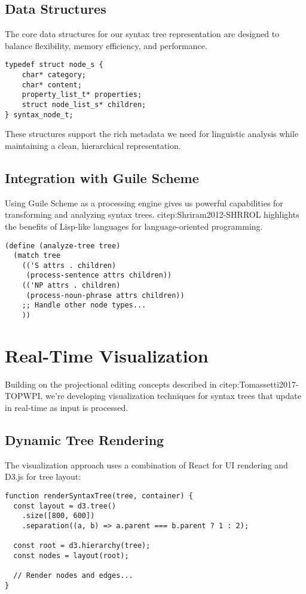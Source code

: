 \documentclass[a4paper,11pt]{article}
\begin{document}
\subsection{Data Structures}
\label{sec:org88788cd}

The core data structures for our syntax tree representation are designed to balance flexibility, memory efficiency, and performance.

\begin{verbatim}
typedef struct node_s {
    char* category;
    char* content;
    property_list_t* properties;
    struct node_list_s* children;
} syntax_node_t;
\end{verbatim}

These structures support the rich metadata we need for linguistic analysis while maintaining a clean, hierarchical representation.
\subsection{Integration with Guile Scheme}
\label{sec:orge7e1da4}

Using Guile Scheme as a processing engine gives us powerful capabilities for transforming and analyzing syntax trees. citep:Shriram2012-SHRROL highlights the benefits of Lisp-like languages for language-oriented programming.

\begin{verbatim}
(define (analyze-tree tree)
  (match tree
    (('S attrs . children)
     (process-sentence attrs children))
    (('NP attrs . children)
     (process-noun-phrase attrs children))
    ;; Handle other node types...
    ))
\end{verbatim}
\section{Real-Time Visualization}
\label{sec:org447925c}

Building on the projectional editing concepts described in citep:Tomassetti2017-TOPWPI, we're developing visualization techniques for syntax trees that update in real-time as input is processed.
\subsection{Dynamic Tree Rendering}
\label{sec:orgf3bf800}

The visualization approach uses a combination of React for UI rendering and D3.js for tree layout:

\begin{verbatim}
function renderSyntaxTree(tree, container) {
  const layout = d3.tree()
    .size([800, 600])
    .separation((a, b) => a.parent === b.parent ? 1 : 2);

  const root = d3.hierarchy(tree);
  const nodes = layout(root);

  // Render nodes and edges...
}
\end{verbatim}
\end{document}
